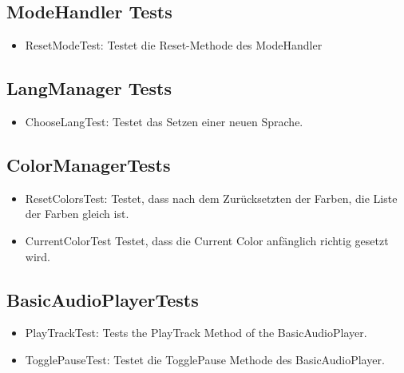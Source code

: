 \documentclass[../validierung.tex]{subfiles}
\begin{document}
		\subsection{ModeHandler Tests}
			\begin{itemize}
				\item ResetModeTest: Testet die Reset-Methode des ModeHandler
			\end{itemize}
		\subsection{LangManager Tests}
			\begin{itemize}
				\item ChooseLangTest: Testet das Setzen einer neuen Sprache.
			\end{itemize}
		\subsection{ColorManagerTests}
			\begin{itemize}
				\item ResetColorsTest: Testet, dass nach dem Zurücksetzten der Farben, die Liste der Farben gleich ist.
				\item CurrentColorTest Testet, dass die Current Color anfänglich richtig gesetzt wird.
			\end{itemize}
		\subsection{BasicAudioPlayerTests}
			\begin{itemize}
				\item PlayTrackTest: Tests the PlayTrack Method of the BasicAudioPlayer.
				\item TogglePauseTest: Testet die TogglePause Methode des BasicAudioPlayer.
			\end{itemize}
\end{document}
